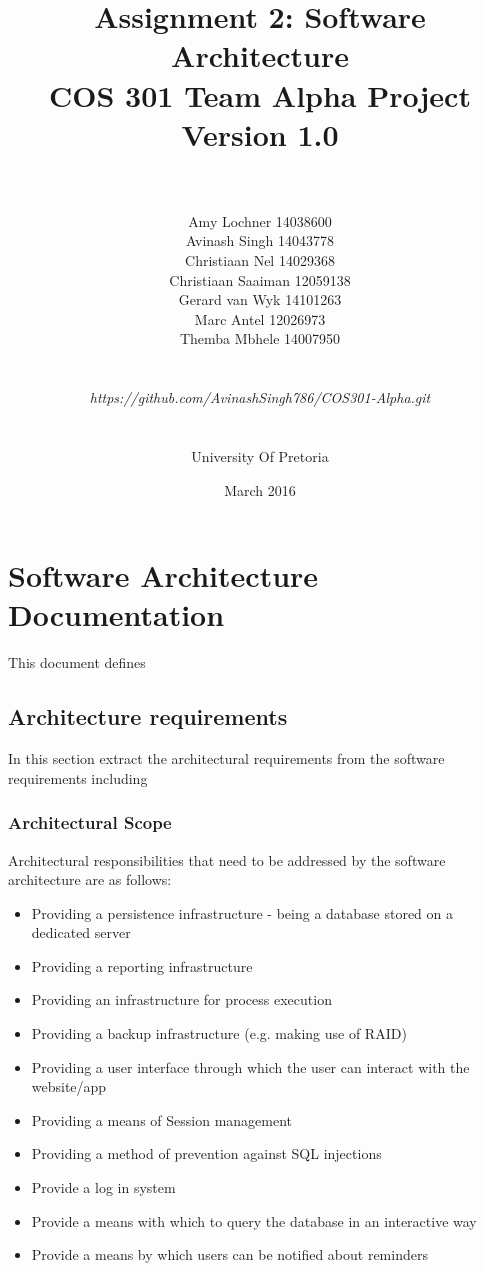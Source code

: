 \documentclass[a4paper]{article}
\title{\huge Assignment 2: Software Architecture
	\\COS 301 Team Alpha Project
	\\Version 1.0}
\author{\\\\Amy Lochner 14038600\\ Avinash Singh 14043778 \\
	Christiaan Nel 14029368\\ Christiaan Saaiman 12059138 \\
	Gerard van Wyk 14101263\\ Marc Antel 12026973\\
	Themba Mbhele 14007950
	\\
	\\
	\\\textit{https://github.com/AvinashSingh786/COS301-Alpha.git}
	\\
	\\
	\\ University Of Pretoria\\}
\date{March 2016}
\begin{document}
	
	\maketitle

	\newpage

	\tableofcontents
	\newpage
	
	\section{Software Architecture Documentation}
	
	This document defines 
	
	\subsection{Architecture requirements}
In this section extract the architectural requirements from the software requirements including

	\subsubsection{Architectural Scope}
	    Architectural responsibilities that need to be addressed by the software architecture are as follows:
	    \begin{itemize}
    		\item Providing a persistence infrastructure - being a database stored on a dedicated server
    		\item Providing a reporting infrastructure
    		\item Providing an infrastructure for process execution
    		\item Providing a backup infrastructure (e.g. making use of RAID)
    		\item Providing a user interface through which the user can interact with the website/app
    		\item Providing a means of Session management
    		\item Providing a method of prevention against SQL injections
    		\item Provide a log in system
    		\item Provide a means with which to query the database in an interactive way
    		\item Provide a means by which users can be notified about reminders
    	\end{itemize}
\end{document}
